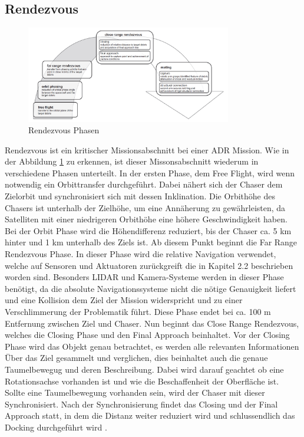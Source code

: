 					
	\subsection{Rendezvous} 

	\begin{figure}[h]
			\centering
					\includegraphics[width=0.80\textwidth]{./graphics/ADR/Rendezvous.PNG}
				\caption{Rendezvous Phasen\cite{Castronuovo.2011}}
				\label{fig:Rendezvous}
			\end{figure}
			
	
	Rendezvous ist ein kritischer Missionsabschnitt bei einer ADR Mission. Wie in der Abbildung \ref{fig:Rendezvous} zu erkennen, ist dieser Missonsabschnitt wiederum in verschiedene Phasen unterteilt. In der ersten Phase, dem Free Flight, wird wenn notwendig ein Orbittransfer durchgeführt. Dabei nähert sich der Chaser dem Zielorbit und synchronisiert sich mit dessen Inklination. Die Orbithöhe des Chasers ist unterhalb der Zielhöhe, um eine Annäherung zu gewährleisten, da Satelliten mit einer niedrigeren Orbithöhe eine höhere Geschwindigkeit haben. Bei der Orbit Phase wird die Höhendifferenz reduziert, bis der Chaser ca. 5 km hinter und 1 km unterhalb des Ziels ist. Ab diesem Punkt beginnt die Far Range Rendezvous Phase. In dieser Phase wird die relative Navigation verwendet, welche auf Sensoren und Aktuatoren zurückgreift die in Kapitel 2.2 beschrieben worden sind. Besonders LIDAR und Kamera-Systeme werden in dieser Phase benötigt, da die absolute Navigationssysteme nicht die nötige Genauigkeit liefert und eine Kollision dem Ziel der Mission widerspricht und zu einer Verschlimmerung der Problematik führt. Diese Phase endet bei ca. 100 m Entfernung zwischen Ziel und Chaser. Nun beginnt das Close Range Rendezvous, welches die Closing Phase und den Final Approach beinhaltet. Vor der Closing Phase wird das Objekt genau betrachtet, es werden alle relevanten Informationen Über das Ziel gesammelt und verglichen, dies beinhaltet auch die genaue Taumelbewegug und deren Beschreibung. Dabei wird darauf geachtet ob eine Rotationsachse vorhanden ist und wie die Beschaffenheit der Oberfläche ist. Sollte eine Taumelbewegung vorhanden sein, wird der Chaser mit dieser Synchronisiert. Nach der Synchronisierung findet das Closing und der Final Approach statt, in dem die Distanz weiter reduziert wird und schlussendlich das Docking durchgeführt wird \cite{Castronuovo.2011}. 
 
